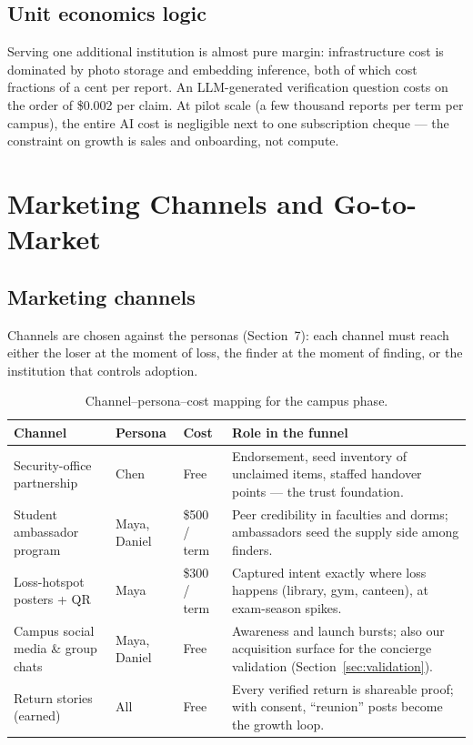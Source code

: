 \documentclass[11pt,a4paper]{article}
\begin{document}
\subsection{Unit economics logic}

Serving one additional institution is almost pure margin: infrastructure cost is dominated
by photo storage and embedding inference, both of which cost fractions of a cent per report.
An LLM-generated verification question costs on the order of \$0.002 per claim. At pilot
scale (a few thousand reports per term per campus), the entire AI cost is negligible next
to one subscription cheque --- the constraint on growth is sales and onboarding, not
compute.

\section{Marketing Channels and Go-to-Market}
\label{sec:gtm}

\subsection{Marketing channels}

Channels are chosen against the personas (Section~7): each channel must reach either the
loser at the moment of loss, the finder at the moment of finding, or the institution that
controls adoption.

\begin{table}[H]
\centering
\small
\renewcommand{\arraystretch}{1.35}
\begin{tabularx}{\textwidth}{>{\raggedright\arraybackslash}p{3.6cm} l l Y}
\toprule
\textbf{Channel} & \textbf{Persona} & \textbf{Cost} & \textbf{Role in the funnel} \\
\midrule
Security-office partnership & Chen & Free & Endorsement, seed inventory of unclaimed
items, staffed handover points --- the trust foundation. \\
Student ambassador program & Maya, Daniel & \$500 / term & Peer credibility in faculties
and dorms; ambassadors seed the supply side among finders. \\
Loss-hotspot posters + QR & Maya & \$300 / term & Captured intent exactly where loss
happens (library, gym, canteen), at exam-season spikes. \\
Campus social media \& group chats & Maya, Daniel & Free & Awareness and launch bursts;
also our acquisition surface for the concierge validation (Section~\ref{sec:validation}). \\
Return stories (earned) & All & Free & Every verified return is shareable proof; with
consent, ``reunion'' posts become the growth loop. \\
\bottomrule
\end{tabularx}
\caption{Channel--persona--cost mapping for the campus phase.}
\end{table}
\end{document}
